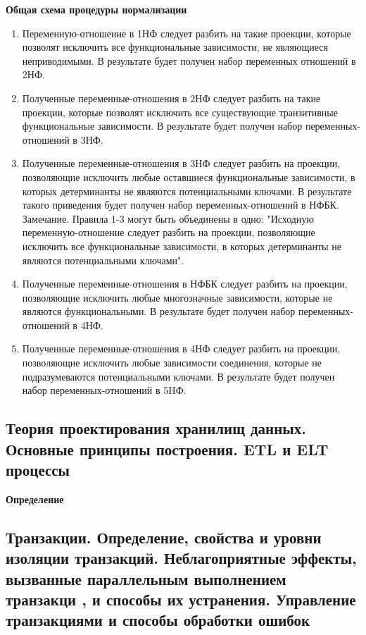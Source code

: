 \textbf{Общая схема процедуры нормализации}
\begin{enumerate}
	\item Переменную-отношение в 1НФ следует разбить на такие проекции, которые позволят исключить все функциональные зависимости, не являющиеся неприводимыми. В результате будет получен набор переменных отношений в 2НФ.
	\item Полученные переменные-отношения в 2НФ следует разбить на такие проекции, которые позволят исключить все существующие транзитивные функциональные зависимости. В результате будет получен набор переменных-отношений в 3НФ.
	\item Полученные переменные-отношения в 3НФ следует разбить на проекции, позволяющие исключить любые
	оставшиеся функциональные зависимости, в которых детерминанты не являются потенциальными ключами. В результате такого приведения будет получен набор переменных-отношений в НФБК. 
	Замечание.
	Правила 1-3 могут быть объединены в одно: "Исходную переменную-отношение следует разбить на проекции, позволяющие исключить все функциональные зависимости, в которых детерминанты не являются
	потенциальными ключами".
	\item Полученные переменные-отношения в НФБК следует разбить на проекции, позволяющие исключить любые многозначные зависимости, которые не являются функциональными. В результате будет получен
	набор переменных- отношений в 4НФ.
	\item Полученные переменные-отношения в 4НФ следует разбить на проекции, позволяющие исключить любые зависимости соединения, которые не подразумеваются потенциальными ключами. В результате будет
	получен набор переменных-отношений в 5HФ.
\end{enumerate} 


\subsection{Теория проектирования хранилищ данных. Основные принципы построения. ETL и ELT процессы}

\textbf{Определение}

\subsection{Транзакции. Определение, свойства и уровни изоляции транзакций. Неблагоприятные эффекты, вызванные параллельным выполнением транзакци , и способы их устранения. Управление транзакциями и способы обработки ошибок}

